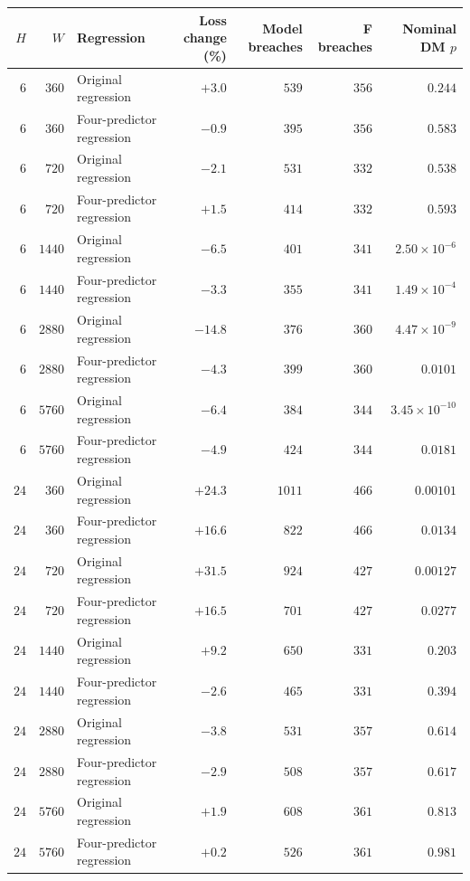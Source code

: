\begin{center}\begin{tabular}{rrp{33mm}rrrr}
\toprule
$H$ & $W$ & Regression & Loss change (\%) & Model breaches & F breaches & \shortstack{Nominal\\DM $p$} \\
\midrule
$6$ & $360$ & Original regression & $+3.0$ & $539$ & $356$ & $0.244$ \\ %
$6$ & $360$ & Four-predictor regression & $-0.9$ & $395$ & $356$ & $0.583$ \\ %
$6$ & $720$ & Original regression & $-2.1$ & $531$ & $332$ & $0.538$ \\ %
$6$ & $720$ & Four-predictor regression & $+1.5$ & $414$ & $332$ & $0.593$ \\ %
$6$ & $1440$ & Original regression & $-6.5$ & $401$ & $341$ & $2.50\times10^{-6}$ \\ %
$6$ & $1440$ & Four-predictor regression & $-3.3$ & $355$ & $341$ & $1.49\times10^{-4}$ \\ %
$6$ & $2880$ & Original regression & $-14.8$ & $376$ & $360$ & $4.47\times10^{-9}$ \\ %
$6$ & $2880$ & Four-predictor regression & $-4.3$ & $399$ & $360$ & $0.0101$ \\ %
$6$ & $5760$ & Original regression & $-6.4$ & $384$ & $344$ & $3.45\times10^{-10}$ \\ %
$6$ & $5760$ & Four-predictor regression & $-4.9$ & $424$ & $344$ & $0.0181$ \\ %
$24$ & $360$ & Original regression & $+24.3$ & $1011$ & $466$ & $0.00101$ \\ %
$24$ & $360$ & Four-predictor regression & $+16.6$ & $822$ & $466$ & $0.0134$ \\ %
$24$ & $720$ & Original regression & $+31.5$ & $924$ & $427$ & $0.00127$ \\ %
$24$ & $720$ & Four-predictor regression & $+16.5$ & $701$ & $427$ & $0.0277$ \\ %
$24$ & $1440$ & Original regression & $+9.2$ & $650$ & $331$ & $0.203$ \\ %
$24$ & $1440$ & Four-predictor regression & $-2.6$ & $465$ & $331$ & $0.394$ \\ %
$24$ & $2880$ & Original regression & $-3.8$ & $531$ & $357$ & $0.614$ \\ %
$24$ & $2880$ & Four-predictor regression & $-2.9$ & $508$ & $357$ & $0.617$ \\ %
$24$ & $5760$ & Original regression & $+1.9$ & $608$ & $361$ & $0.813$ \\ %
$24$ & $5760$ & Four-predictor regression & $+0.2$ & $526$ & $361$ & $0.981$ \\ %
\bottomrule
\end{tabular}\end{center}
